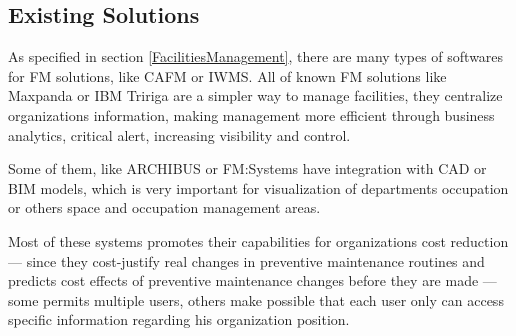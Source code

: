 


\subsection{Existing Solutions}

As specified in section \ref{FacilitiesManagement}, there are many types of softwares for FM solutions, like CAFM or IWMS. All of known FM solutions like Maxpanda \cite{maxpanda} or IBM Tririga \cite{IBMtririga} are a simpler way to manage facilities, they centralize organizations information, making management more efficient through business analytics, critical alert, increasing visibility and control.

Some of them, like ARCHIBUS \cite{ARCHIBUSsite} or FM:Systems \cite{FMsystems} have integration with CAD or BIM models, which is very important for visualization of departments occupation or others space and occupation management areas. 

Most of these systems promotes their capabilities for organizations cost reduction --- since they cost-justify real changes in preventive maintenance routines and predicts cost effects of preventive maintenance changes before they are made --- some permits multiple users, others make possible that each user only can access specific information regarding his organization position.

